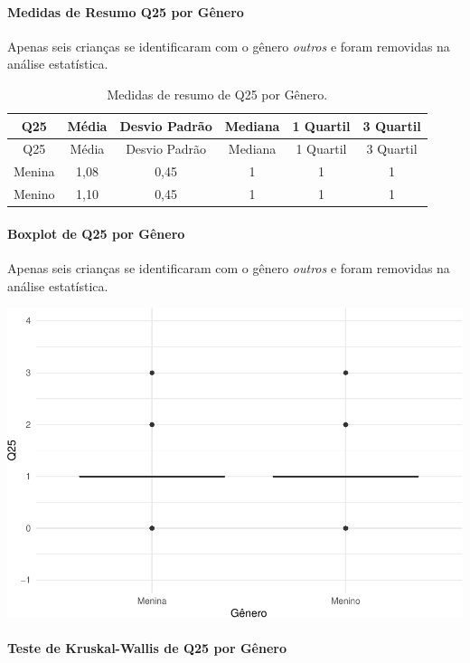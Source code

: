 \documentclass[]{article}
\let\oldparagraph\paragraph
\renewcommand{\paragraph}[1]{\oldparagraph{#1}\mbox{}}
\begin{document}
\hypertarget{medidas-de-resumo-q25-por-guxeanero}{%
\paragraph{Medidas de Resumo Q25 por Gênero}\label{medidas-de-resumo-q25-por-guxeanero}}

Apenas seis crianças se identificaram com o gênero \emph{outros} e foram removidas na análise estatística.

\begin{longtable}[]{@{}cccccc@{}}
\caption{\label{tab:unnamed-chunk-675}Medidas de resumo de Q25 por Gênero.}\tabularnewline
\toprule
Q25 & Média & Desvio Padrão & Mediana & 1 Quartil & 3 Quartil\tabularnewline
\midrule
\endfirsthead
\toprule
Q25 & Média & Desvio Padrão & Mediana & 1 Quartil & 3 Quartil\tabularnewline
\midrule
\endhead
Menina & 1,08 & 0,45 & 1 & 1 & 1\tabularnewline
Menino & 1,10 & 0,45 & 1 & 1 & 1\tabularnewline
\bottomrule
\end{longtable}

\hypertarget{boxplot-de-q25-por-guxeanero}{%
\paragraph{Boxplot de Q25 por Gênero}\label{boxplot-de-q25-por-guxeanero}}

Apenas seis crianças se identificaram com o gênero \emph{outros} e foram removidas na análise estatística.

\begin{center}\includegraphics[width=0.75\linewidth]{relatorio_covid19_files/figure-latex/unnamed-chunk-676-1} \end{center}

\hypertarget{teste-de-kruskal-wallis-de-q25-por-guxeanero}{%
\paragraph{Teste de Kruskal-Wallis de Q25 por Gênero}\label{teste-de-kruskal-wallis-de-q25-por-guxeanero}}
\end{document}
